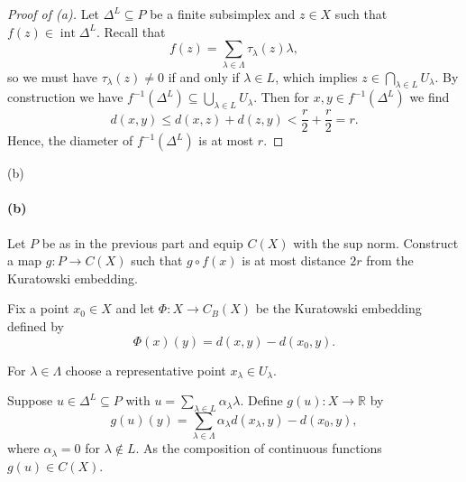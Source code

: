 \documentclass[12pt]{article}
\newlength{\myparskip}
\newenvironment{fullbox}{\begin{lrbox}{\savefullbox}\begin{minipage}{\dimexpr\textwidth-2\fboxsep\relax}\setlength{\parskip}{\myparskip}}{\end{minipage}\end{lrbox}\framebox[\textwidth]{\usebox{\savefullbox}}}
\newenvironment{pbox}[1][]{\begin{fullbox}\ifx#1\empty\else\paragraph{#1}\phantom{}\fi}{\end{fullbox}}
\theoremstyle{definition}
\newcommand{\R}{\mathbb{R}}
\newcommand{\<}{\langle}
\renewcommand{\>}{\rangle}
\DeclareMathOperator{\inter}{int}
\begin{document}
\begin{proof}[Proof of (a)]
    Let $\Delta^L \subseteq P$ be a finite subsimplex and $z \in X$ such that $f(z) \in \inter \Delta^L$.
    Recall that
    \[
        f(z) = \sum_{\lambda \in \Lambda} \tau_\lambda(z) \lambda,
    \]
    so we must have $\tau_\lambda(z) \ne 0$ if and only if $\lambda \in L$, which implies $z \in \bigcap_{\lambda \in L} U_\lambda$.
    By construction we have $f^{-1}(\Delta^L) \subseteq \bigcup_{\lambda \in L} U_\lambda$. Then for $x, y \in f^{-1}(\Delta^L)$ we find
    \[
        d(x, y) \leq d(x, z) + d(z, y) < \frac{r}{2} + \frac{r}{2} = r.
    \]
    Hence, the diameter of $f^{-1}(\Delta^L)$ is at most $r$.
\end{proof}

\newpage
\begin{pbox}[(b)]
    Let $P$ be as in the previous part and equip $C(X)$ with the sup norm.
    Construct a map $g:P \to C(X)$ such that $g \circ f(x)$ is at most distance
    $2r$ from the Kuratowski embedding.
\end{pbox}

Fix a point $x_0 \in X$ and let $\Phi : X \to C_B(X)$ be the Kuratowski embedding defined by
\[
    \Phi(x)(y) = d(x, y) - d(x_0, y).
\]

For $\lambda \in \Lambda$ choose a representative point $x_\lambda \in U_\lambda$.

Suppose $u \in \Delta^L \subseteq P$ with $u = \sum_{\lambda \in L} \alpha_\lambda \lambda$.
Define $g(u) : X \to \R$ by
\[
    g(u)(y) = \sum_{\lambda \in \Lambda} \alpha_\lambda d(x_\lambda, y) - d(x_0, y),
\]
where $\alpha_\lambda = 0$ for $\lambda \notin L$. As the composition of continuous functions $g(u) \in C(X)$.
\end{document}
